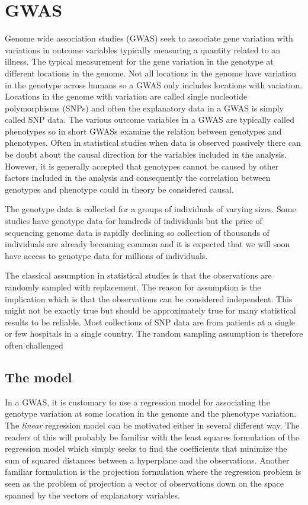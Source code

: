 \documentclass[final,leqno]{siamltex1213}
\begin{document}
\section{GWAS}
Genome wide association studies (GWAS) seek to associate gene variation with variations in outcome variables typically measuring a quantity related to an illness. The typical measurement for the gene variation in the genotype at different locations in the genome. Not all locations in the genome have variation in the genotype across humans so a GWAS only includes locations with variation. Locations in the genome with variation are called single nucleotide polymorphisms (SNPs) and often the explanatory data in a GWAS is simply called SNP data. The various outcome variables in a GWAS are typically called phenotypes so in short GWASs examine the relation between genotypes and phenotypes. Often in statistical studies when data is observed passively there can be doubt about the causal direction for the variables included in the analysis. However, it is generally accepted that genotypes cannot be caused by other factors included in the analysis and consequently the correlation between genotypes and phenotype could in theory be considered causal.

The genotype data is collected for a groups of individuals of varying sizes. Some studies have genotype data for hundreds of individuals but the price of sequencing genome data is rapidly declining so collection of thousands of individuals are already becoming common and it is expected that we will soon  have access to genotype data for millions of individuals.

The classical assumption in statistical studies is that the observations are randomly sampled with replacement. The reason for assumption is the implication which is that the observations can be considered independent. This might not be exactly true but should be approximately true for many statistical results to be reliable. Most collections of SNP data are from patients at a single or few hospitals in a single country. The random sampling assumption is therefore often challenged

\subsection{The model}
In a GWAS, it is customary to use a regression model for associating the genotype variation at some location in the genome and the phenotype variation. The \emph{linear} regression model can be motivated either in several different way. The readers of this will probably be familiar with the least squares formulation of the regression model which simply seeks to find the coefficients that minimize the sum of squared distances between a hyperplane and the observations. Another familiar formulation is the projection formulation where the regression problem is seen as the problem of projection a vector of observations down on the space spanned by the vectors of explanatory variables.
\end{document}
